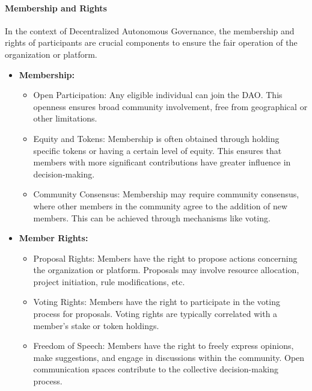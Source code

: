\documentclass[lettersize,journal]{IEEEtran}
\begin{document}
\paragraph{Membership and Rights}
In the context of Decentralized Autonomous Governance, the membership and rights of participants are crucial components to ensure the fair operation of the organization or platform. 

\begin{itemize}
  \item \textbf{Membership:}
  \begin{itemize}
    \item Open Participation: Any eligible individual can join the DAO. This openness ensures broad community involvement, free from geographical or other limitations.
    \item Equity and Tokens: Membership is often obtained through holding specific tokens or having a certain level of equity. This ensures that members with more significant contributions have greater influence in decision-making.
    \item Community Consensus: Membership may require community consensus, where other members in the community agree to the addition of new members. This can be achieved through mechanisms like voting.
  \end{itemize}
  \item \textbf{Member Rights:}
  \begin{itemize}
    \item Proposal Rights: Members have the right to propose actions concerning the organization or platform. Proposals may involve resource allocation, project initiation, rule modifications, etc.
    \item Voting Rights: Members have the right to participate in the voting process for proposals. Voting rights are typically correlated with a member's stake or token holdings.
    \item Freedom of Speech: Members have the right to freely express opinions, make suggestions, and engage in discussions within the community. Open communication spaces contribute to the collective decision-making process.

\end{itemize}
\end{itemize}
\end{document}
